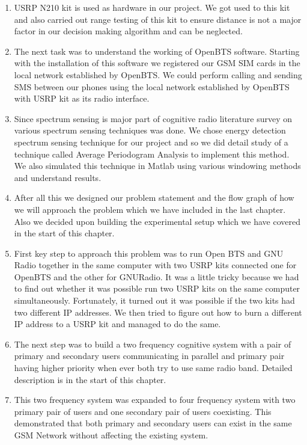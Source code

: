 \begin{enumerate}
\item USRP N210 kit is used as hardware in our project. We got used to this kit and 
also carried out range testing of this kit to ensure distance is not a major factor in 
our decision making algorithm and can be neglected.
\item The next task was to understand the working of OpenBTS software. Starting 
with the installation of this software we registered our GSM SIM cards in the 
local network established by OpenBTS. We could perform calling and sending SMS
between our phones using the local network established by OpenBTS with USRP 
kit as its radio interface.
\item Since spectrum sensing is major part of cognitive radio literature survey 
on various spectrum sensing techniques was done. We chose energy detection 
spectrum sensing technique for our project and so we did detail study of a 
technique called Average Periodogram Analysis to implement this method. We also 
simulated this technique in Matlab using various windowing methods and 
understand results. 
\item After all this we designed our problem statement and the flow graph of 
how we will approach the problem which we have included in the last chapter. 
Also we decided upon building the experimental setup which we have covered in 
the start of this chapter. 
\item  First key step to approach this problem was to run Open BTS and GNU 
Radio together in the same computer with two USRP kits connected one for 
OpenBTS and the other for GNURadio. It was a little tricky because we had to
find out whether it was possible run two USRP kits on the same computer simultaneously.
Fortunately, it turned out it was possible if the two kits had two different IP addresses.
We then tried to figure out how to burn a different IP address to a USRP kit and
managed to do the same.
\item The next step was to build a two frequency cognitive system with a pair of 
primary and secondary users communicating in parallel and primary pair having 
higher priority when ever both try to use same radio band. Detailed description 
is in the start of this chapter.
\item This two frequency system was expanded to four frequency system with two 
primary pair of users and one secondary pair of users coexisting. This 
demonstrated that both primary and secondary users can exist in the same GSM 
Network without affecting the existing system.
\end{enumerate}